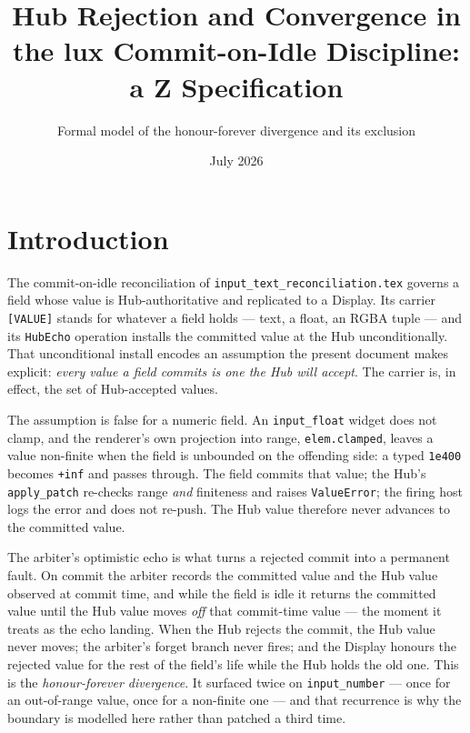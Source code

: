 \documentclass[a4paper,10pt,fleqn]{article}
\begin{document}
\title{Hub Rejection and Convergence in the lux Commit-on-Idle Discipline:
  a Z Specification}
\author{Formal model of the honour-forever divergence and its exclusion}
\date{July 2026}
\maketitle

\section{Introduction}

The commit-on-idle reconciliation of \texttt{input\_text\_reconciliation.tex}
governs a field whose value is Hub-authoritative and replicated to a Display.
Its carrier \texttt{[VALUE]} stands for whatever a field holds --- text, a float,
an RGBA tuple --- and its \texttt{HubEcho} operation installs the committed value
at the Hub unconditionally.  That unconditional install encodes an assumption the
present document makes explicit: \emph{every value a field commits is one the Hub
will accept}.  The carrier is, in effect, the set of Hub-accepted values.

The assumption is false for a numeric field.  An \texttt{input\_float} widget does
not clamp, and the renderer's own projection into range, \texttt{elem.clamped},
leaves a value non-finite when the field is unbounded on the offending side: a
typed \texttt{1e400} becomes \texttt{+inf} and passes through.  The field commits
that value; the Hub's \texttt{apply\_patch} re-checks range \emph{and} finiteness
and raises \texttt{ValueError}; the firing host logs the error and does not
re-push.  The Hub value therefore never advances to the committed value.

The arbiter's optimistic echo is what turns a rejected commit into a permanent
fault.  On commit the arbiter records the committed value and the Hub value
observed at commit time, and while the field is idle it returns the committed
value until the Hub value moves \emph{off} that commit-time value --- the moment
it treats as the echo landing.  When the Hub rejects the commit, the Hub value
never moves; the arbiter's forget branch never fires; and the Display honours the
rejected value for the rest of the field's life while the Hub holds the old one.
This is the \emph{honour-forever divergence}.  It surfaced twice on
\texttt{input\_number} --- once for an out-of-range value, once for a non-finite
one --- and that recurrence is why the boundary is modelled here rather than
patched a third time.
\end{document}
